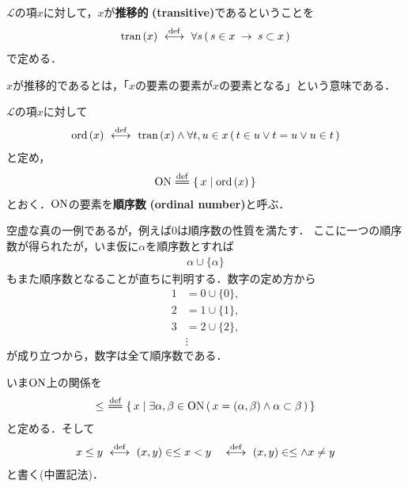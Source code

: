 	\begin{screen}
		\begin{dfn}[推移的類]
			$\mathcal{L}$の項$x$に対して，$x$が{\bf 推移的}
			{\bf (transitive)}であるということを
			\begin{align}
				\operatorname*{tran}\hspace{0.15em}(x) \ \overset{\mathrm{def}}{\longleftrightarrow}\ 
				\forall s\, (\, s \in x \hspace{0.25em}\rightarrow\hspace{0.25em} s \subset x\, )
			\end{align}
			で定める．
		\end{dfn}
	\end{screen}
	
	$x$が推移的であるとは，「$x$の要素の要素が$x$の要素となる」という意味である．
	
	\begin{screen}
		\begin{dfn}[順序数]
			$\mathcal{L}$の項$x$に対して
			\begin{align}
				\operatorname*{ord}\hspace{0.15em}(x) \ \overset{\mathrm{def}}{\longleftrightarrow}\  \operatorname*{tran}\hspace{0.15em}(x) \wedge 
				\forall t,u \in x\, (\, t \in u \vee t = u \vee u \in t\, )
			\end{align}
			と定め，
			\begin{align}
				\ON \defeq \Set{x}{\ord{x}}
			\end{align}
			とおく．$\mathrm{ON}$の要素を{\bf 順序数}\index{じゅんじょすう@順序数}
			{\bf (ordinal number)}と呼ぶ．
		\end{dfn}
	\end{screen}
	
	空虚な真の一例であるが，例えば$0$は順序数の性質を満たす．
	ここに一つの順序数が得られたが，いま仮に$\alpha$を順序数とすれば
	\begin{align}
		\alpha \cup \{\alpha\}
	\end{align}
	もまた順序数となることが直ちに判明する．数字の定め方から
	\begin{align}
		1 &= 0 \cup \{0\}, \\
		2 &= 1 \cup \{1\}, \\
		3 &= 2 \cup \{2\}, \\
		&\vdots
	\end{align}
	が成り立つから，数字は全て順序数である．
	
	いま$\mathrm{ON}$上の関係を
	\begin{align}
		\leq\ \defeq \Set{x}{\exists \alpha,\beta \in \ON\, 
		(\, x=(\alpha,\beta) \wedge \alpha \subset \beta\, )}
	\end{align}
	と定める．そして
	\begin{align}
		x \leq y &\ \overset{\mathrm{def}}{\longleftrightarrow}\  (x,y) \in \leq
		x < y &\ \overset{\mathrm{def}}{\longleftrightarrow}\  (x,y) \in \leq \wedge x \neq y
	\end{align}
	と書く(中置記法)．
	
